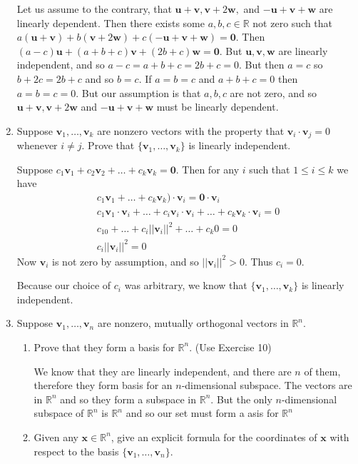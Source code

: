 \documentclass[letterpaper]{article}
\begin{document}
\begin{enumerate}
Let us assume to the contrary, that $\mathbf{u}+\mathbf{v}, \mathbf{v}+2\mathbf{w},$ and $-\mathbf{u}+\mathbf{v}+\mathbf{w}$ are linearly dependent. Then there exists some $a,b,c\in \mathbb{R}$ not zero such that $a(\mathbf{u}+\mathbf{v})+b(\mathbf{v}+2\mathbf{w})+c(-\mathbf{u}+\mathbf{v}+\mathbf{w})=\mathbf{0}$. Then $(a-c)\mathbf{u}+(a+b+c)\mathbf{v}+(2b+c)\mathbf{w}=\mathbf{0}$. But $\mathbf{u},\mathbf{v},\mathbf{w}$ are linearly independent, and so $a-c=a+b+c=2b+c=0$. But then $a=c$ so $b+2c=2b+c$ and so $b=c$. If $a=b=c$ and $a+b+c=0$ then $a=b=c=0$. But our assumption is that $a,b,c$ are not zero, and so $\mathbf{u}+\mathbf{v}, \mathbf{v}+2\mathbf{w}$ and $-\mathbf{u}+\mathbf{v}+\mathbf{w}$ must be linearly dependent.
\setcounter{enumi}{9}
\item
Suppose $\mathbf{v}_1,\dots,\mathbf{v}_k$ are nonzero vectors with the property that $\mathbf{v}_i\cdot\mathbf{v}_j=0$ whenever $i\ne j$. Prove that $\{\mathbf{v}_1,\dots,\mathbf{v}_k\}$ is linearly independent.

Suppose $c_1\mathbf{v}_1+c_2\mathbf{v}_2+\dots+c_k\mathbf{v}_k=\mathbf{0}$.
Then for any $i$ such that $1\le i\le k$ we have
\begin{align*}
  c_1\mathbf{v}_1+\dots+c_k\mathbf{v}_k)\cdot\mathbf{v}_i=\mathbf{0}\cdot\mathbf{v}_i\\
  c_1\mathbf{v}_1\cdot\mathbf{v}_i+\dots+c_i\mathbf{v}_i\cdot\mathbf{v}_i+\dots+c_k\mathbf{v}_k\cdot\mathbf{v}_i=0\\
  c_10+\dots+c_i||\mathbf{v}_i||^2+\dots+c_k0=0\\
  c_i||\mathbf{v}_i||^2=0
\end{align*}
Now $\mathbf{v}_i$ is not zero by assumption, and so $||\mathbf{v}_i||^2>0$. Thus $c_i=0$.

Because our choice of $c_i$ was arbitrary, we know that $\{\mathbf{v}_1,\dots,\mathbf{v}_k\}$ is linearly independent.
\item
Suppose $\mathbf{v}_1,\dots,\mathbf{v}_n$ are nonzero, mutually orthogonal vectors in $\mathbb{R}^n$.
  \begin{enumerate}
  \item
  Prove that they form a basis for $\mathbb{R}^n$. (Use Exercise 10)

  We know that they are linearly independent, and there are $n$ of them, therefore they form basis for an $n$-dimensional subspace. The vectors are in $\mathbb{R}^{n}$ and so they form a subspace in $\mathbb{R}^n$. But the only $n$-dimensional subspace of $\mathbb{R}^n$ is $\mathbb{R}^n$ and so our set must form a asis for $\mathbb{R}^n$
  \item
  Given any $\mathbf{x}\in \mathbb{R}^n$, give an explicit formula for the coordinates of $\mathbf{x}$ with respect to the basis $\{\mathbf{v}_1,\dots,\mathbf{v}_n\}$.


\end{enumerate}
\end{enumerate}
\end{document}
